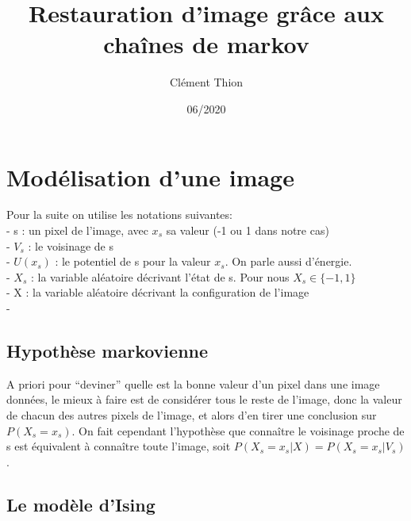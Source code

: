 \documentclass[
]{article}
\title{Restauration d'image grâce aux chaînes de markov}
\author{Clément Thion}
\date{06/2020}
\begin{document}
\maketitle

\hypertarget{moduxe9lisation-dune-image}{%
\section{Modélisation d'une image}\label{moduxe9lisation-dune-image}}

Pour la suite on utilise les notations suivantes:\\
- s : un pixel de l'image, avec \(x_s\) sa valeur (-1 ou 1 dans notre
cas)\\
- \(V_s\) : le voisinage de s\\
- \(U(x_s)\) : le potentiel de s pour la valeur \(x_s\). On parle aussi
d'énergie.\\
- \(X_s\) : la variable aléatoire décrivant l'état de s. Pour nous
\(X_s\in\{-1,1\}\)\\
- X : la variable aléatoire décrivant la configuration de l'image\\
-

\hypertarget{hypothuxe8se-markovienne}{%
\subsection{Hypothèse markovienne}\label{hypothuxe8se-markovienne}}

A priori pour ``deviner'' quelle est la bonne valeur d'un pixel dans une
image données, le mieux à faire est de considérer tous le reste de
l'image, donc la valeur de chacun des autres pixels de l'image, et alors
d'en tirer une conclusion sur \(P(X_s=x_s)\). On fait cependant
l'hypothèse que connaître le voisinage proche de s est équivalent à
connaître toute l'image, soit \(P(X_s=x_s|X)=P(X_s=x_s|V_s)\).

\hypertarget{le-moduxe8le-dising}{%
\subsection{Le modèle d'Ising}\label{le-moduxe8le-dising}}
\end{document}
